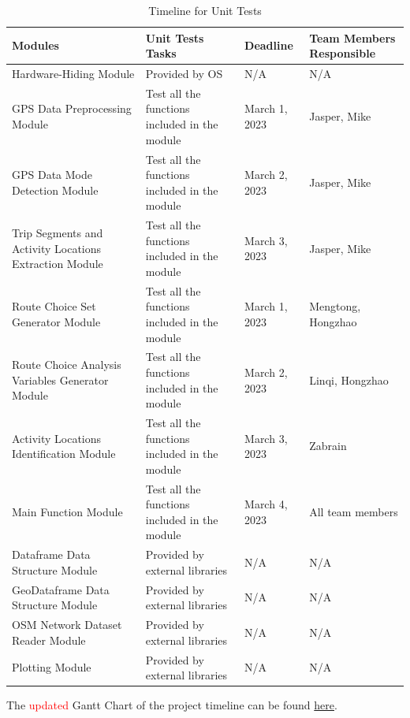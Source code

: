 \documentclass[12pt, titlepage]{article}
\begin{document}
\begin{table}[h!]
    \color{red}
    \centering
    \begin{tabular}{|>{\raggedright}p{}|p{}|p{}|p{}|}
    \hline
    \textbf{Modules} & \textbf{Unit Tests Tasks} & \textbf{Deadline} & \textbf{Team Members Responsible}\\
    \hline
     Hardware-Hiding Module & Provided by OS & N/A & N/A\\
    \hline
     GPS Data Preprocessing Module & Test all the functions included in the module & March 1, 2023 & Jasper, Mike\\
    \hline
     GPS Data Mode Detection Module & Test all the functions included in the module & March 2, 2023 & Jasper, Mike\\
    \hline
     Trip Segments and Activity Locations Extraction Module & Test all the functions included in the module & March 3, 2023 & Jasper, Mike\\
    \hline
     Route Choice Set Generator Module & Test all the functions included in the module & March 1, 2023 & Mengtong, Hongzhao\\
    \hline
     Route Choice Analysis Variables Generator Module & Test all the functions included in the module & March 2, 2023 & Linqi, Hongzhao\\
    \hline
     Activity Locations Identification Module & Test all the functions included in the module & March 3, 2023 & Zabrain\\
    \hline
     Main Function Module & Test all the functions included in the module & March 4, 2023 & All team members\\
    \hline
     Dataframe Data Structure Module & Provided by external libraries & N/A & N/A\\
    \hline
     GeoDataframe Data Structure Module & Provided by external libraries & N/A & N/A\\
    \hline
     OSM Network Dataset Reader Module & Provided by external libraries & N/A & N/A\\
    \hline
     Plotting Module & Provided by external libraries & N/A & N/A\\
    \hline
    \end{tabular}
    \caption{Timeline for Unit Tests}
    \label{tab:timeline}
\end{table}

The \textcolor{red}{updated} Gantt Chart of the project timeline can be found \href{https://github.com/paezha/PyERT-BLACK/blob/main/docs/Project%20Schedule/Capstone%20timeline.pdf}{here}.
\end{document}
